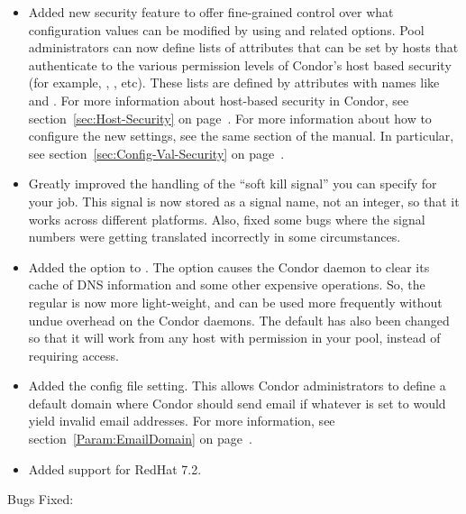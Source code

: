 \begin{itemize}
\item Added new security feature to offer fine-grained control over
what configuration values can be modified by 
using  and related options.
Pool administrators can now define lists of attributes that can be set
by hosts that authenticate to the various permission levels of
Condor's host based security (for example, ,
, etc).
These lists are defined by attributes with names like
 and
. 
For more information about host-based security in Condor, see
section~\ref{sec:Host-Security} on page~\pageref{sec:Host-Security}.
For more information about how to configure the new settings, see the
same section of the manual.
In particular, see section~\ref{sec:Config-Val-Security} on
page~\pageref{sec:Config-Val-Security}. 

\item Greatly improved the handling of the ``soft kill signal'' you
can specify for your job.
This signal is now stored as a signal name, not an integer, so that it
works across different platforms.
Also, fixed some bugs where the signal numbers were getting translated
incorrectly in some circumstances.

\item Added the  option to .
The  option causes the Condor daemon to clear its cache of
DNS information and some other expensive operations.
So, the regular  is now more light-weight, and can
be used more frequently without undue overhead on the Condor daemons. 
The default  has also been changed so that it will
work from any host with  permission in your pool,
instead of requiring  access.

\item Added the  config file setting.
This allows Condor administrators to define a default domain where
Condor should send email if whatever  is set to
would yield invalid email addresses.
For more information, see section~\ref{Param:EmailDomain} on
page~\pageref{Param:EmailDomain}.

\item
Added support for RedHat 7.2.

\end{itemize}

\noindent Bugs Fixed:

